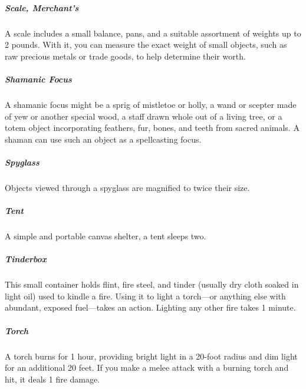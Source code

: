 \subparagraph*{Scale, Merchant's} A scale includes a small balance, pans, and a suitable assortment of weights up to 2 pounds. With it, you can measure the exact weight of small objects, such as raw precious metals or trade goods, to help determine their worth.

\subparagraph*{Shamanic Focus} A shamanic focus might be a sprig of mistletoe or holly, a wand or scepter made of yew or another special wood, a staff drawn whole out of a living tree, or a totem object incorporating feathers, fur, bones, and teeth from sacred animals. A shaman can use such an object as a spellcasting focus.

\subparagraph*{Spyglass} Objects viewed through a spyglass are magnified to twice their size.

\subparagraph*{Tent} A simple and portable canvas shelter, a tent sleeps two.

\subparagraph*{Tinderbox} This small container holds flint, fire steel, and tinder (usually dry cloth soaked in light oil) used to kindle a fire. Using it to light a torch—or anything else with abundant, exposed fuel—takes an action. Lighting any other fire takes 1 minute.

\subparagraph*{Torch} A torch burns for 1 hour, providing bright light in a 20-foot radius and dim light for an additional 20 feet. If you make a melee attack with a burning torch and hit, it deals 1 fire damage.

